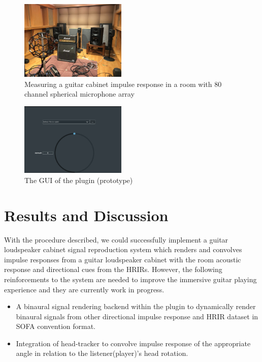 \documentclass[convention,e-brief]{aesconf-current}
\begin{document}
\begin{figure}
    \centering
    \includegraphics[width=0.45\textwidth]{./fig/fullerene.jpg}
    \caption{Measuring a guitar cabinet impulse response in a room with 80 channel spherical microphone array}
    \label{fig:fullerene}
\end{figure}

\begin{figure}
    \centering
    \includegraphics[width=0.45\textwidth]{./fig/gui.png}
    \caption{The GUI of the plugin (prototype)}
    \label{fig:gui}
\end{figure}

\section{Results and Discussion}
With the procedure described, we could successfully implement a guitar loudspeaker cabinet signal reproduction system which renders and convolves impulse responses from a guitar loudspeaker cabinet with the room acoustic response and directional cues from the HRIRs.
However, the following reinforcements to the system are needed to improve the immersive guitar playing experience and they are currently work in progress.

\begin{itemize}
    \item A binaural signal rendering backend within the plugin to dynamically render binaural signals from other directional impulse response and HRIR dataset in SOFA convention format.
    \item Integration of head-tracker to convolve impulse response of the appropriate angle in relation to the listener(player)'s head rotation.
\end{itemize}
\end{document}
